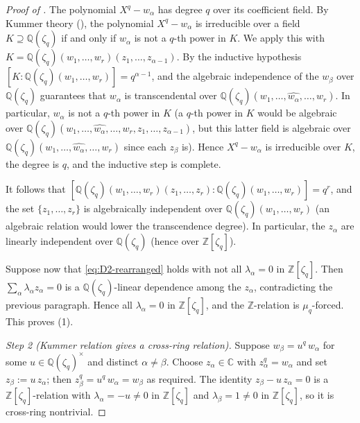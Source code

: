 \documentclass[aip,jmp,preprint,amsmath,amssymb,nofootinbib,floatfix]{revtex4-2}
\theoremstyle{plain}
\theoremstyle{definition}
\theoremstyle{remark}
\newcommand{\Zlc}{\mathbb{Z}[\zeta_q]}
\newcommand{\Qlc}{\mathbb{Q}(\zeta_q)}
\begin{document}
\begin{proof}[Proof of ]
The polynomial $X^q - w_\alpha$ has degree $q$ over its coefficient
field. By Kummer theory (\cite[Ch.~VI, Thm.~9.1]{lang-algebra}), the
polynomial $X^q - w_\alpha$ is irreducible over a field $K \supseteq
\Qlc$ if and only if $w_\alpha$ is not a $q$-th power in $K$. We
apply this with $K = \Qlc(w_1, \dots, w_r)(z_1, \dots, z_{\alpha - 1})$.
By the inductive hypothesis $[K : \Qlc(w_1, \dots, w_r)] = q^{\alpha - 1}$,
and the algebraic independence of the $w_\beta$ over $\Qlc$ guarantees
that $w_\alpha$ is transcendental over $\Qlc(w_1, \dots,
\widehat{w_\alpha}, \dots, w_r)$. In particular, $w_\alpha$ is not a
$q$-th power in $K$ (a $q$-th power in $K$ would be algebraic over
$\Qlc(w_1, \dots, \widehat{w_\alpha}, \dots, w_r, z_1, \dots,
z_{\alpha - 1})$, but this latter field is algebraic over
$\Qlc(w_1, \dots, \widehat{w_\alpha}, \dots, w_r)$ since each
$z_\beta$ is). Hence $X^q - w_\alpha$ is irreducible over $K$, the
degree is $q$, and the inductive step is complete.

It follows that
$[\Qlc(w_1, \dots, w_r)(z_1, \dots, z_r) :
\Qlc(w_1, \dots, w_r)] = q^r$, and the set $\{z_1, \dots, z_r\}$ is
algebraically independent over $\Qlc(w_1, \dots, w_r)$ (an algebraic
relation would lower the transcendence degree). In particular, the
$z_\alpha$ are linearly independent over $\Qlc$ (hence over $\Zlc$).

Suppose now that \eqref{eq:D2-rearranged} holds with not all
$\lambda_\alpha = 0$ in $\Zlc$. Then $\sum_\alpha \lambda_\alpha z_\alpha
= 0$ is a $\Qlc$-linear dependence among the $z_\alpha$, contradicting
the previous paragraph. Hence all $\lambda_\alpha = 0$ in $\Zlc$, and
the $\mathbb{Z}$-relation is $\mu_q$-forced. This proves (1).

\smallskip
\textit{Step 2 (Kummer relation gives a cross-ring relation).}
Suppose $w_\beta = u^q\, w_\alpha$ for some $u \in \Qlc^\times$ and
distinct $\alpha \ne \beta$. Choose $z_\alpha \in \mathbb{C}$ with
$z_\alpha^q = w_\alpha$ and set $z_\beta := u\, z_\alpha$; then
$z_\beta^q = u^q\, w_\alpha = w_\beta$ as required. The identity
$z_\beta - u\, z_\alpha = 0$ is a $\Zlc$-relation with $\lambda_\alpha
= -u \ne 0$ in $\Zlc$ and $\lambda_\beta = 1 \ne 0$ in $\Zlc$, so it
is cross-ring nontrivial.


\end{proof}
\end{document}
